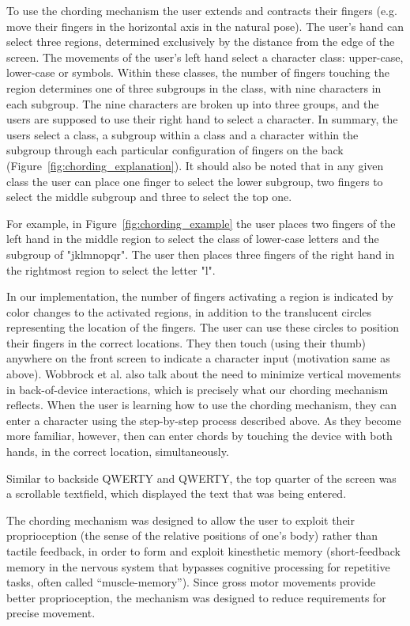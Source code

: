 To use the chording mechanism the user extends and contracts their fingers (e.g. move their fingers in the horizontal axis in the natural pose). The user's hand can select three regions, determined exclusively by the distance from the edge of the screen. The movements of the user's left hand select a character class: upper-case, lower-case or symbols. Within these classes, the number of fingers touching the region determines one of three subgroups in the class, with nine characters in each subgroup. The nine characters are broken up into three groups, and the users are supposed to use their right hand to select a character. In summary, the users select a class, a subgroup within a class and a character within the subgroup through each particular configuration of fingers on the back (Figure~\ref{fig:chording_explanation}). It should also be noted that in any given class the user can place one finger to select the lower subgroup, two fingers to select the middle subgroup and three to select the top one.

For example, in Figure~\ref{fig:chording_example} the user places two fingers of the left hand in the middle region to select the class of lower-case letters and the subgroup of "jklmnopqr". The user then places three fingers of the right hand in the rightmost region to select the letter "l".

In our implementation, the number of fingers activating a region is indicated by color changes to the activated regions, in addition to the translucent circles representing the location of the fingers. The user can use these circles to position their fingers in the correct locations. They then touch (using their thumb) anywhere on the front screen to indicate a character input (motivation same as above). Wobbrock et al. \cite{Wobbrock} also talk about the need to minimize vertical movements in back-of-device interactions, which is precisely what our chording mechanism reflects. When the user is learning how to use the chording mechanism, they can enter a character using the step-by-step process described above.  As they become more familiar, however, then can enter chords by touching the device with both hands, in the correct location, simultaneously.

Similar to backside QWERTY and QWERTY, the top quarter of the screen was a scrollable textfield, which displayed the text that was being entered.

The chording mechanism was designed to allow the user to exploit their proprioception (the sense of the relative positions of one's body) rather than tactile feedback, in order to form and exploit kinesthetic memory (short-feedback memory in the nervous system that bypasses cognitive processing for repetitive tasks, often called ``muscle-memory''). Since gross motor movements provide better proprioception, the mechanism was designed to reduce requirements for precise movement.


